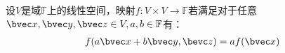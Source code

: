 \begin{definition}{}
设$V$是域$\mathbb F$上的线性空间，映射$f:V\times V\rightarrow\mathbb F$若满足对于任意$\bvec x,\bvec y,\bvec z \in V,a,b\in \mathbb F$有：
\begin{equation}
\begin{aligned}
f(a\bvec x+b\bvec y,\bevc z)=af(\bvec x)
\end{aligned}
\end{equation}

\end{definition}

